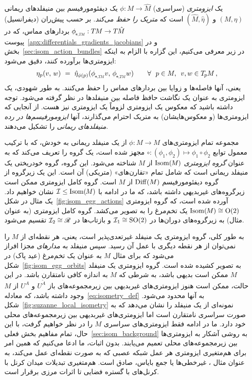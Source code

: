 یک \emph{ایزومتری} (سراسری) $\phi: M \to \hat{M}$ یک دیفئومورفیسم بین منیفلدهای ریمانی $(M,\eta)$ و $(\hat{M},\hat{\eta})$ است که \emph{متریک را حفظ می‌کند}.
بر حسب پیش‌ران (دیفرانسیل) $\dphiTM: \TM \to T\mkern-1.5mu\hat{M}$ بردارهای مماس، که در پیوست~\ref{apx:differentials_gradients_jacobians} و در بخش~\ref{sec:isom_action_bundles} در زیر معرفی می‌کنیم، این گزاره با الزام به اینکه ایزومتری‌ها برآورده کنند، دقیق می‌شود:
\begin{align}\label{eq:isometry_def}
    \eta_p(v,\, w)\ =\ \hat{\eta}_{\phi(p)}( \dphiTM v,\, \dphiTM w) \qquad \forall\ \ p\in M,\,\ v,w\in \TpM \,,
\end{align}
یعنی، آنها فاصله‌ها و زوایا بین بردارهای مماس را حفظ می‌کنند.
به طور شهودی، یک ایزومتری به عنوان یک نگاشت حافظ فاصله بین منیفلدها در نظر گرفته می‌شود.
توجه داشته باشید که معکوس یک ایزومتری لزوماً یک ایزومتری نیز هست.
از آنجایی که ایزومتری‌ها (و معکوس‌هایشان) به متریک احترام می‌گذارند، آنها \emph{ایزومورفیسم‌ها در رده منیفلدهای ریمانی} را تشکیل می‌دهند.


مجموعه تمام ایزومتری‌های $\phi: M \to M$ از یک منیفلد ریمانی به خودش، که با ترکیب معمول توابع $\circ: (\phi_1, \phi_2) \mapsto \phi_1 \circ \phi_2$ مجهز شده است، یک گروه را تعریف می‌کند که به عنوان \emph{گروه ایزومتری} $\operatorname{Isom}(\mkern-1.5mu M \mkern-.5mu)$ از $M$ شناخته می‌شود.
این گروه، گروه خودریختی یک منیفلد ریمانی است که شامل تمام «تقارن‌های» (متریکی) آن است.
این یک زیرگروه از گروه دیفئومورفیسم $\operatorname{Diff}(M)$ از $M$ است.
گروه کامل ایزومتری ممکن است زیرگروه‌های غیربدیهی داشته باشد، که ما در ادامه با $\mathcal{I} \leq \operatorname{Isom}(\mkern-1.5mu M \mkern-.5mu)$ نشان خواهیم داد.
یک مثال در شکل~\ref{fig:isom_egg_actions} آورده شده است، که گروه ایزومتری $\operatorname{Isom}(\mkern-1.5mu M \mkern-.5mu) \cong \operatorname{O}(2)$ یک تخم‌مرغ را به تصویر می‌کشد.
گروه کامل ایزومتری (به عنوان مثال) به زیرگروه‌های دوران‌ها در $\mathcal{I}_1 \cong \operatorname{SO}(2)$ و بازتاب‌ها در $\mathcal{I}_2 \cong \mathscr{R}$ تقسیم می‌شود.


به طور کلی، گروه ایزومتری یک منیفلد غیرتعدی‌پذیر است، یعنی، هر نقطه‌ای از $M$ را نمی‌توان از هر نقطه دیگری با عمل آن رسید.
سپس منیفلد به \emph{مدارهای} مجزا افراز می‌شود که برای مثال $M$ به عنوان یک تخم‌مرغ (عید پاک) در شکل~\ref{fig:isom_egg_orbits} به تصویر کشیده شده است.
گروه ایزومتری یک منیفلد $M$ ممکن است بدیهی باشد، به شرطی که $M$ به اندازه کافی نامتقارن باشد.
در این حالت، ممکن است هنوز ایزومتری‌های غیربدیهی بین زیرمجموعه‌های باز $U^{\widetilde{A}}$ و $U^A$ از $M$ وجود داشته باشد، که معادله~\eqref{eq:isometry_def} به آنها محدود می‌شود.
شکل~\ref{fig:suzanne_local_isometry} نمونه‌ای از یک منیفلد را نشان می‌دهد که به صورت سراسری نامتقارن است اما ایزومتری‌های غیربدیهی بین زیرمجموعه‌های محلی خود دارد.
ما در ادامه فقط ایزومتری‌های سراسری $M$ را در نظر خواهیم گرفت، با این حال، تمام مفاهیم بخش فعلی~\ref{sec:isom_background} به روشی آشکار به ایزومتری‌ها بین زیرمجموعه‌های محلی تعمیم می‌یابند.
بدون اثبات، ما ادعا می‌کنیم که همین امر برای هم‌متغیری ایزومتری هر عمل شبکه عصبی که به صورت نقطه‌ای عمل می‌کند، به عنوان مثال \onexonesfarsi، غیرخطی‌ها یا جمع بایاس، صادق است.
هم‌متغیری تبدیلات میدان کرنل با کرنل‌های با گستره فضایی تا اثرات مرزی برقرار است.

